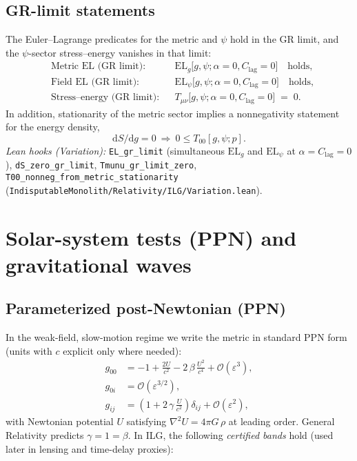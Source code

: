 \documentclass[12pt,a4paper]{article}
\begin{document}
\subsection{GR-limit statements}
The Euler–Lagrange predicates for the metric and \(\psi\) hold in the GR limit, and the \(\psi\)-sector stress–energy vanishes in that limit:
\begin{align}
  &\text{Metric EL (GR limit):} &
  &\mathrm{EL}_g\bigl[g,\psi;\alpha{=}0,C_{\!\mathrm{lag}}{=}0\bigr] \quad\text{holds}, \label{eq:ELg-GR}\\
  &\text{Field EL (GR limit):}  &
  &\mathrm{EL}_\psi\bigl[g,\psi;\alpha{=}0,C_{\!\mathrm{lag}}{=}0\bigr] \quad\text{holds}, \label{eq:ELpsi-GR}\\
  &\text{Stress--energy (GR limit):} &
  &T_{\mu\nu}\bigl[g,\psi;\alpha{=}0,C_{\!\mathrm{lag}}{=}0\bigr] \;=\; 0. \label{eq:Tmunu-GR}
\end{align}
In addition, stationarity of the metric sector implies a nonnegativity statement for the energy density,
\begin{equation}
  \mathrm{d}S/\mathrm{d}g=0 \ \Longrightarrow\ 0\le T_{00}[g,\psi;p].
  \label{eq:T00-nonneg}
\end{equation}
\emph{Lean hooks (Variation):}
\texttt{EL\_gr\_limit} (simultaneous \(\mathrm{EL}_g\) and \(\mathrm{EL}_\psi\) at \(\alpha{=}C_{\!\mathrm{lag}}{=}0\)),
\texttt{dS\_zero\_gr\_limit}, \texttt{Tmunu\_gr\_limit\_zero}, \texttt{T00\_nonneg\_from\_metric\_stationarity}
(\texttt{IndisputableMonolith/Relativity/ILG/Variation.lean}).

\section{Solar-system tests (PPN) and gravitational waves}

\subsection{Parameterized post-Newtonian (PPN)}
In the weak-field, slow-motion regime we write the metric in standard PPN form (units with \(c\) explicit only where needed):
\begin{align}
  g_{00} &= -1 + \frac{2U}{c^2} - 2\,\beta\,\frac{U^2}{c^4} + \mathcal{O}(\varepsilon^3),\\
  g_{0i} &= \mathcal{O}(\varepsilon^{3/2}),\\
  g_{ij} &= \left(1 + 2\,\gamma\,\frac{U}{c^2}\right)\delta_{ij} + \mathcal{O}(\varepsilon^2),
\end{align}
with Newtonian potential \(U\) satisfying \(\nabla^2 U = 4\pi G\,\rho\) at leading order. General Relativity predicts \(\gamma=1=\beta\). In ILG, the following \emph{certified bands} hold (used later in lensing and time-delay proxies):
\end{document}
